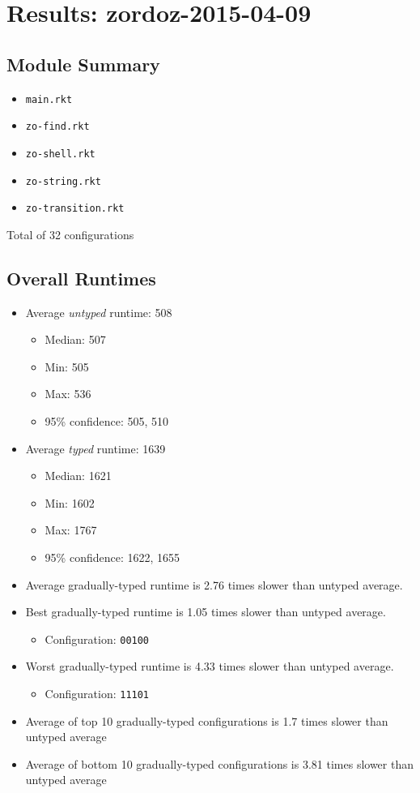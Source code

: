 \documentclass{article}
\newcommand{\mono}[1]{\texttt{#1}}
\begin{document}
\section{Results: zordoz-2015-04-09}

\subsection{Module Summary}
\begin{itemize}
\item \mono{main.rkt}
\item \mono{zo-find.rkt}
\item \mono{zo-shell.rkt}
\item \mono{zo-string.rkt}
\item \mono{zo-transition.rkt}\end{itemize}
Total of 32 configurations

\subsection{Overall Runtimes}
\begin{itemize}
\item Average \emph{untyped} runtime: 508
  \begin{itemize}
  \item Median: 507
  \item Min: 505
  \item Max: 536
  \item 95\% confidence: 505, 510
  \end{itemize}
\item Average \emph{typed} runtime: 1639
  \begin{itemize}
  \item Median: 1621
  \item Min: 1602
  \item Max: 1767
  \item 95\% confidence: 1622, 1655
  \end{itemize}
\item Average gradually-typed runtime is 2.76 times slower than untyped average.
\item Best gradually-typed runtime is 1.05 times slower than untyped average.
\begin{itemize}\item Configuration: \mono{00100}\end{itemize}
\item Worst gradually-typed runtime is 4.33 times slower than untyped average.
\begin{itemize}\item Configuration: \mono{11101}\end{itemize}
\item Average of top 10 gradually-typed configurations is 1.7 times slower than untyped average
\item Average of bottom 10 gradually-typed configurations is 3.81 times slower than untyped average
\end{itemize}
\end{document}
